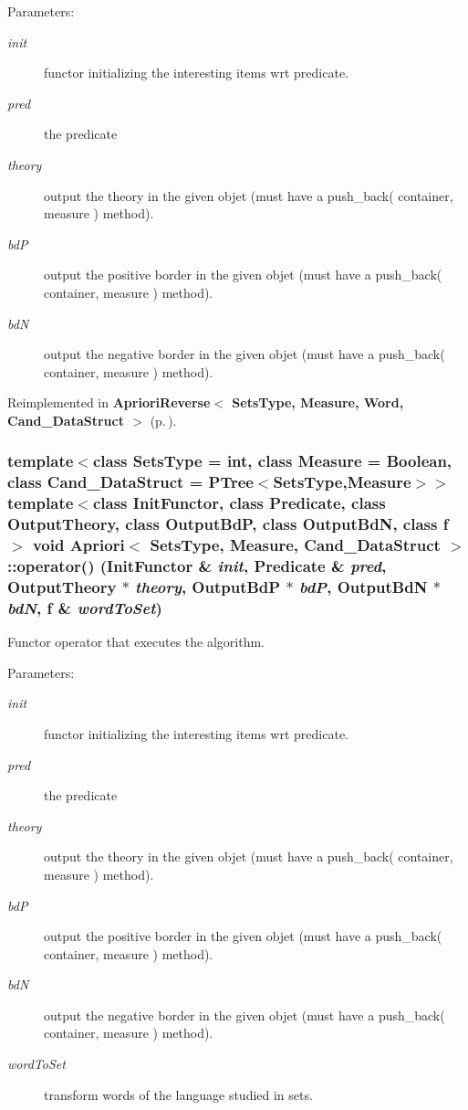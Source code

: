 \begin{Desc}
\item[Parameters:]
\begin{description}
\item[{\em init}]functor initializing the interesting items wrt predicate. \item[{\em pred}]the predicate \item[{\em theory}]output the theory in the given objet (must have a push\_\-back( container, measure ) method). \item[{\em bd\-P}]output the positive border in the given objet (must have a push\_\-back( container, measure ) method). \item[{\em bd\-N}]output the negative border in the given objet (must have a push\_\-back( container, measure ) method). \end{description}
\end{Desc}


Reimplemented in {\bf Apriori\-Reverse$<$ Sets\-Type, Measure, Word, Cand\_\-Data\-Struct $>$} {\rm (p.\,\pageref{class_apriori_reverse_5266cde8d5a9455c9f9281e435754ca9})}.
\subsubsection{\setlength{\rightskip}{0pt plus 5cm}template$<$class Sets\-Type = int, class Measure = Boolean, class Cand\_\-Data\-Struct = PTree$<$Sets\-Type,Measure$>$$>$ template$<$class Init\-Functor, class Predicate, class Output\-Theory, class Output\-Bd\-P, class Output\-Bd\-N, class f$>$ void {\bf Apriori}$<$ Sets\-Type, Measure, Cand\_\-Data\-Struct $>$::operator() (Init\-Functor \& {\em init}, {\bf Predicate} \& {\em pred}, Output\-Theory $\ast$ {\em theory}, Output\-Bd\-P $\ast$ {\em bd\-P}, Output\-Bd\-N $\ast$ {\em bd\-N}, f \& {\em word\-To\-Set})\hspace{0.3cm}{\tt  [inline]}}\label{class_apriori_36d7a2cdad2a8c459f2b44e3ab460591}


Functor operator that executes the algorithm. 

\begin{Desc}
\item[Parameters:]
\begin{description}
\item[{\em init}]functor initializing the interesting items wrt predicate. \item[{\em pred}]the predicate \item[{\em theory}]output the theory in the given objet (must have a push\_\-back( container, measure ) method). \item[{\em bd\-P}]output the positive border in the given objet (must have a push\_\-back( container, measure ) method). \item[{\em bd\-N}]output the negative border in the given objet (must have a push\_\-back( container, measure ) method). \item[{\em word\-To\-Set}]transform words of the language studied in sets. \end{description}
\end{Desc}


